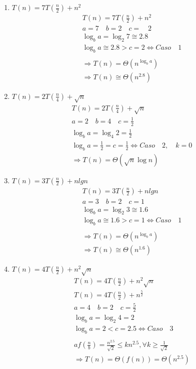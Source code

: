 \documentclass[dcc,uchile,sol]{fcfmcourse}
\begin{document}
\begin{problems}
\begin{enumerate}
    \item $T(n)=7T(\frac{n}{2})+n^2$
    \begin{align*}
        T(n)=7T(\frac { n }{ 2 } )+n^{ 2 }\\ a=7\quad b=2\quad c=\quad 2\\ \log _{ b }{ a } =\log _{ 2 }{ 7 } \cong 2.8\\ \log _{ b }{ a } \cong 2.8>c=2\Leftrightarrow Caso\quad 1\\ \\ \Rightarrow T(n)=\Theta ({ n }^{ \log _{ b }{ a }  })\\ \Rightarrow T(n)\cong \Theta ({ n }^{ 2.8 })
    \end{align*}
    \item $T(n)=2T(\frac{n}{4})+\sqrt{n}$
    \begin{align*}
        T(n)=2T(\frac { n }{ 4 } )+\sqrt { n } \\ a=2\quad b=4\quad c=\frac { 1 }{ 2 } \\ \log _{ b }{ a } =\log _{ 4 }{ 2 } =\frac { 1 }{ 2 } \\ \log _{ b }{ a } =\frac { 1 }{ 2 } =c=\frac { 1 }{ 2 } \Leftrightarrow Caso\quad 2,\quad k=0\\ \Rightarrow T(n)=\Theta (\sqrt { n } \log { n } )
    \end{align*}
    \item $T(n)=3T(\frac{n}{2})+nlgn$
    \begin{align*}
        T(n)=3T(\frac { n }{ 2 } )+nlgn\\ a=3\quad b=2\quad c=1\\ \log _{ b }{ a } =\log _{ 2 }{ 3 } \cong 1.6\\ \log _{ b }{ a } \cong 1.6>c=1\Leftrightarrow Caso\quad 1\\ \\\Rightarrow T(n)=\Theta ({ n }^{ \log _{ b }{ a }  })\\ \Rightarrow T(n)\cong \Theta ({ n }^{ 1.6 })
    \end{align*}
    \item $T(n)=4T(\frac{n}{2})+n^2\sqrt{n}$
    \begin{align*}
        T(n)=4T(\frac { n }{ 2 } )+n^{ 2 }\sqrt { n } \\ T(n)=4T(\frac { n }{ 2 } )+n^{ \frac { 5 }{ 2 }  }\\ a=4\quad b=2\quad c=\frac { 5 }{ 2 } \\ \log _{ b }{ a } =\log _{ 2 }{ 4 } =2\\ \log _{ b }{ a } =2<c=2.5\Leftrightarrow Caso\quad 3\\ \\ af(\frac { n }{ b } )=\frac { { n }^{ 2.5 } }{ \sqrt { 2 }  } \le kn^{ 2.5 },\forall k\ge \frac { 1 }{ \sqrt { 2 }  } \\ \Rightarrow T(n)=\Theta (f(n))=\Theta (n^{ 2.5 })

\end{align*}
\end{enumerate}
\end{problems}
\end{document}
